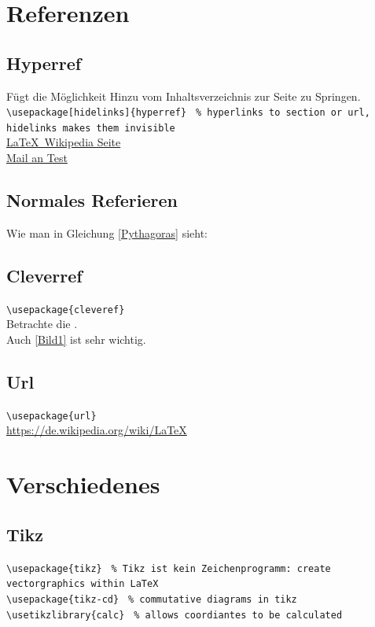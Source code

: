 \documentclass[notitlepage, 11pt, a4paper,ngerman]{article}
\begin{document}
\section{Referenzen}

\subsection{Hyperref}

Fügt die Möglichkeit Hinzu vom Inhaltsverzeichnis zur Seite zu Springen.\\[10pt]
\verb|\usepackage[hidelinks]{hyperref}| \texttt{ \% hyperlinks to section or url, hidelinks makes them invisible}\\[10pt]
\href{https://de.wikipedia.org/wiki/LaTeX}{\LaTeX \ Wikipedia Seite}\\
\href{mailto:test@example.net}{Mail an Test}

\subsection{Normales Referieren}

Wie man in Gleichung \ref{Pythagoras} sieht:

\subsection{Cleverref}

\verb|\usepackage{cleveref}|\\[10pt]
Betrachte die .\\ Auch \cref{Bild1} ist sehr wichtig.

\subsection{Url}

\verb|\usepackage{url}|\\[10pt]
\url{https://de.wikipedia.org/wiki/LaTeX}


\section{Verschiedenes}

\subsection{Tikz}

\verb|\usepackage{tikz}| \texttt{ \% Tikz ist kein Zeichenprogramm: create vectorgraphics within LaTeX}\\
\verb|\usepackage{tikz-cd}| \texttt{ \% commutative diagrams in tikz}\\
\verb|\usetikzlibrary{calc}| \texttt{ \% allows coordiantes to be calculated}\\[10pt]
\end{document}
